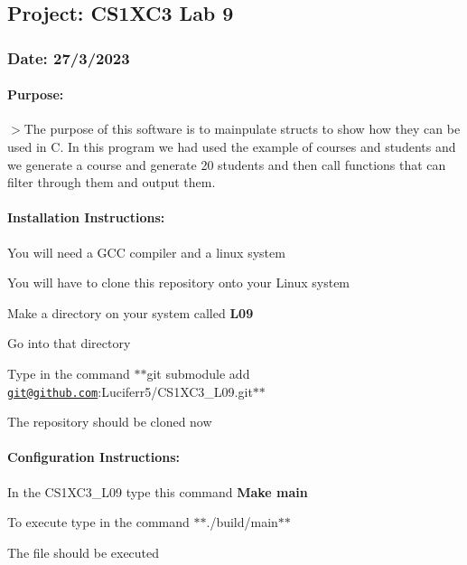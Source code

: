 \subsection*{Project\+: C\+S1\+X\+C3 Lab 9}

\subsubsection*{Date\+: {\bfseries 27/3/2023}}

\paragraph*{Purpose\+:}

$>$The purpose of this software is to mainpulate structs to show how they can be used in C. In this program we had used the example of courses and students and we generate a course and generate 20 students and then call functions that can filter through them and output them.

\paragraph*{Installation Instructions\+:}


\begin{DoxyEnumerate}
\item You will need a G\+CC compiler and a linux system
\item You will have to clone this repository onto your Linux system
\item Make a directory on your system called {\bfseries L09}
\item Go into that directory
\item Type in the command $\ast$$\ast$git submodule add \href{mailto:git@github.com}{\tt git@github.\+com}\+:Luciferr5/\+C\+S1\+X\+C3\+\_\+\+L09.\+git$\ast$$\ast$
\item The repository should be cloned now
\end{DoxyEnumerate}

\paragraph*{Configuration Instructions\+:}


\begin{DoxyEnumerate}
\item In the C\+S1\+X\+C3\+\_\+\+L09 type this command {\bfseries Make main}
\item To execute type in the command $\ast$$\ast$./build/main$\ast$$\ast$
\item The file should be executed
\end{DoxyEnumerate}

